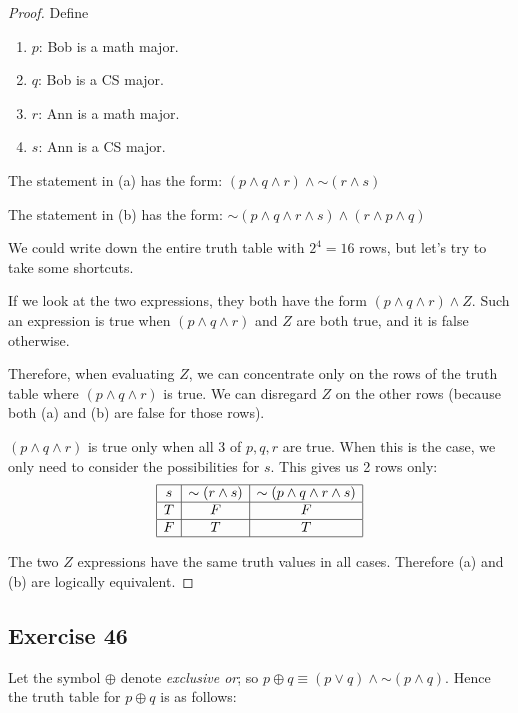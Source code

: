 \documentclass[14pt]{extarticle}
\begin{document}
\begin{proof} Define 
\begin{enumerate} 
\item $p$: Bob is a math major. 
\item $q$: Bob is a CS major. 
\item $r$: Ann is a math major. 
\item $s$: Ann is a CS major. 
\end{enumerate}

The statement in (a) has the form: $(p \wedge q \wedge r) \wedge {\sim (r \wedge s)}$

The statement in (b) has the form: ${\sim (p \wedge q \wedge r \wedge s)} \wedge (r \wedge p \wedge q)$

We could write down the entire truth table with $2^4 = 16$ rows, but let's try to take some shortcuts.

If we look at the two expressions, they both have the form $(p \wedge q \wedge r) \wedge Z$. Such an expression is true when $(p \wedge q \wedge r)$ and $Z$ are both true, and it is false otherwise.

Therefore, when evaluating $Z$, we can concentrate only on the rows of the truth table where $(p \wedge q \wedge r)$ is true. We can disregard $Z$ on the other rows (because both (a) and (b) are false for those rows).

$(p \wedge q \wedge r)$ is true only when all 3 of $p, q, r$ are true. When this is the case, we only need to consider the possibilities for $s$. This gives us 2 rows only: 
$$ 
\begin{array}{|c|c|c|} 
\hline 
s & {\sim (r \wedge s)} & {\sim (p \wedge q \wedge r \wedge s)} \\ 
\hline 
T & F & F \\ 
\hline 
F & T & T \\
\hline
\end{array} 
$$

The two $Z$ expressions have the same truth values in all cases. Therefore (a) and (b) are logically equivalent. 
\end{proof}

\subsection{Exercise 46} 
Let the symbol $\oplus$ denote {\it exclusive or}; so $p \oplus q \equiv (p \vee q) \wedge {\sim(p \wedge q)}$. Hence the truth table for $p \oplus q$ is as follows:
\end{document}
